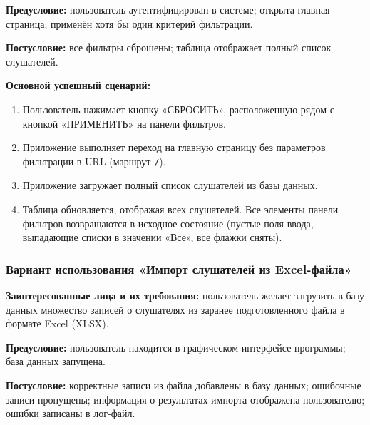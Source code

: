 \textbf{Предусловие:} пользователь аутентифицирован в системе; открыта главная страница; применён хотя бы один критерий фильтрации.

\textbf{Постусловие:} все фильтры сброшены; таблица отображает полный список слушателей.

\textbf{Основной успешный сценарий:}
\begin{enumerate}
	\item Пользователь нажимает кнопку «СБРОСИТЬ», расположенную рядом с кнопкой «ПРИМЕНИТЬ» на панели фильтров.
	\item Приложение выполняет переход на главную страницу без параметров фильтрации в URL (маршрут \texttt{/}).
	\item Приложение загружает полный список слушателей из базы данных.
	\item Таблица обновляется, отображая всех слушателей. Все элементы панели фильтров возвращаются в исходное состояние (пустые поля ввода, выпадающие списки в значении «Все», все флажки сняты).
\end{enumerate}

\subsubsection{Вариант использования «Импорт слушателей из Excel-файла»}

\textbf{Заинтересованные лица и их требования:} пользователь желает загрузить в базу данных множество записей о слушателях из заранее подготовленного файла в формате Excel (XLSX).

\textbf{Предусловие:} пользователь находится в графическом интерфейсе программы; база данных запущена.

\textbf{Постусловие:} корректные записи из файла добавлены в базу данных; ошибочные записи пропущены; информация о результатах импорта отображена пользователю; ошибки записаны в лог-файл.

